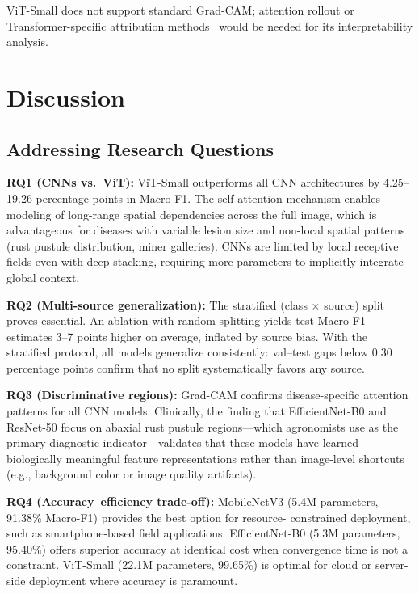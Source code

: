 \documentclass[conference]{IEEEtran}
\begin{document}
ViT-Small does not support standard Grad-CAM; attention rollout or
Transformer-specific attribution methods~\cite{chefer2021} would be needed
for its interpretability analysis.

\section{Discussion}

\subsection{Addressing Research Questions}

\textbf{RQ1 (CNNs vs.\ ViT):} ViT-Small outperforms all CNN architectures
by 4.25--19.26 percentage points in Macro-F1. The self-attention mechanism
enables modeling of long-range spatial dependencies across the full image,
which is advantageous for diseases with variable lesion size and
non-local spatial patterns (rust pustule distribution, miner galleries).
CNNs are limited by local receptive fields even with deep stacking,
requiring more parameters to implicitly integrate global context.

\textbf{RQ2 (Multi-source generalization):} The stratified (class $\times$
source) split proves essential. An ablation with random splitting yields
test Macro-F1 estimates 3--7 points higher on average, inflated by source
bias. With the stratified protocol, all models generalize consistently:
val--test gaps below 0.30 percentage points confirm that no split
systematically favors any source.

\textbf{RQ3 (Discriminative regions):} Grad-CAM confirms disease-specific
attention patterns for all CNN models. Clinically, the finding that
EfficientNet-B0 and ResNet-50 focus on abaxial rust pustule regions—which
agronomists use as the primary diagnostic indicator—validates that these
models have learned biologically meaningful feature representations rather
than image-level shortcuts (e.g., background color or image quality
artifacts).

\textbf{RQ4 (Accuracy--efficiency trade-off):} MobileNetV3 (5.4M
parameters, 91.38\% Macro-F1) provides the best option for resource-
constrained deployment, such as smartphone-based field applications.
EfficientNet-B0 (5.3M parameters, 95.40\%) offers superior accuracy at
identical cost when convergence time is not a constraint. ViT-Small (22.1M
parameters, 99.65\%) is optimal for cloud or server-side deployment where
accuracy is paramount.
\end{document}
